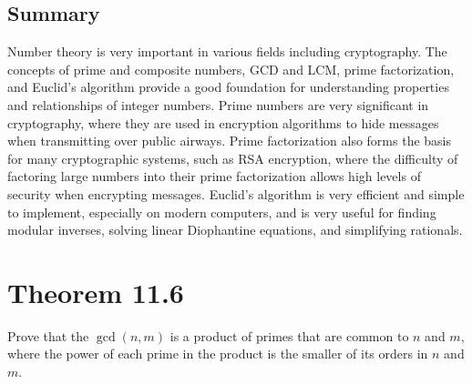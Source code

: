\documentclass{article}
\renewcommand{\_}{\ifincsname_\else\legacyunderscore\fi}
\begin{document}
    \subsection*{Summary}
    Number theory is very important in various fields including cryptography. The concepts of prime and composite numbers, GCD and LCM, prime factorization, and Euclid's algorithm provide a good foundation for understanding properties and relationships of integer numbers. Prime numbers are very significant in cryptography, where they are used in encryption algorithms to hide messages when transmitting over public airways. Prime factorization also forms the basis for many cryptographic systems, such as RSA encryption, where the difficulty of factoring large numbers into their prime factorization allows high levels of security when encrypting messages. Euclid's algorithm is very efficient and simple to implement, especially on modern computers, and is very useful for finding modular inverses, solving linear Diophantine equations, and simplifying rationals. 

\section*{Theorem 11.6}

    Prove that the $\gcd(n, m)$ is a product of primes that are common to $n$ and $m$, where the power of each prime in the product is the smaller of its orders in $n$ and $m$.
\end{document}

